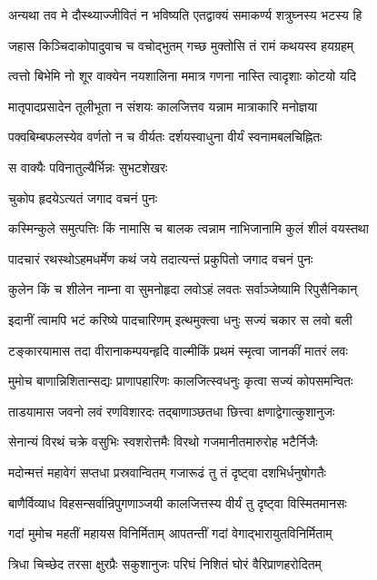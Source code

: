 \twolineshloka
{अन्यथा तव मे दौस्थ्याज्जीवितं न भविष्यति}
{एतद्वाक्यं समाकर्ण्य शत्रुघ्नस्य भटस्य हि}%

\twolineshloka
{जहास किञ्चिदाकोपादुवाच च वचोद्भुतम्}
{गच्छ मुक्तोसि तं रामं कथयस्व हयग्रहम्}%

\twolineshloka
{त्वत्तो बिभेमि नो शूर वाक्येन नयशालिना}
{ममात्र गणना नास्ति त्वादृशाः कोटयो यदि}%

\twolineshloka
{मातृपादप्रसादेन तूलीभूता न संशयः}
{कालजित्तव यन्नाम मात्राकारि मनोज्ञया}%

\twolineshloka
{पक्वबिम्बफलस्येव वर्णतो न च वीर्यतः}
{दर्शयस्वाधुना वीर्यं स्वनामबलचिह्नितः}%



\onelineshloka
{स वाक्यैः पविनातुल्यैर्भिन्नः सुभटशेखरः}%

चुकोप हृदयेऽत्यतं जगाद वचनं पुनः

\twolineshloka
{कस्मिन्कुले समुत्पत्तिः किं नामासि च बालक}
{त्वन्नाम नाभिजानामि कुलं शीलं वयस्तथा}%

\twolineshloka
{पादचारं रथस्थोऽहमधर्मेण कथं जये}
{तदात्यन्तं प्रकुपितो जगाद वचनं पुनः}%

\twolineshloka
{कुलेन किं च शीलेन नाम्ना वा सुमनोहृदा}
{लवोऽहं लवतः सर्वाञ्जेष्यामि रिपुसैनिकान्}%

\twolineshloka
{इदानीं त्वामपि भटं करिष्ये पादचारिणम्}
{इत्थमुक्त्वा धनुः सज्यं चकार स लवो बली}%

\twolineshloka
{टङ्कारयामास तदा वीरानाकम्पयन्हृदि}
{वाल्मीकिं प्रथमं स्मृत्वा जानकीं मातरं लवः}%

\twolineshloka
{मुमोच बाणान्निशितान्सद्यः प्राणापहारिणः}
{कालजित्स्वधनुः कृत्वा सज्यं कोपसमन्वितः}%

\twolineshloka
{ताडयामास जवनो लवं रणविशारदः}
{तद्बाणाञ्छतधा छित्त्वा क्षणाद्वेगात्कुशानुजः}%

\twolineshloka
{सेनान्यं विरथं चक्रे वसुभिः स्वशरोत्तमैः}
{विरथो गजमानीतमारुरोह भटैर्निजैः}%

\twolineshloka
{मदोन्मत्तं महावेगं सप्तधा प्रस्रवान्वितम्}
{गजारूढं तु तं दृष्ट्वा दशभिर्धनुषोगतैः}%

\twolineshloka
{बाणैर्विव्याध विहसन्सर्वान्रिपुगणाञ्जयी}
{कालजित्तस्य वीर्यं तु दृष्ट्वा विस्मितमानसः}%

\twolineshloka
{गदां मुमोच महतीं महायस विनिर्मिताम्}
{आपतन्तीं गदां वेगाद्भारायुतविनिर्मिताम्}%

\twolineshloka
{त्रिधा चिच्छेद तरसा क्षुरप्रैः सकुशानुजः}
{परिघं निशितं घोरं वैरिप्राणहरोदितम्}%


